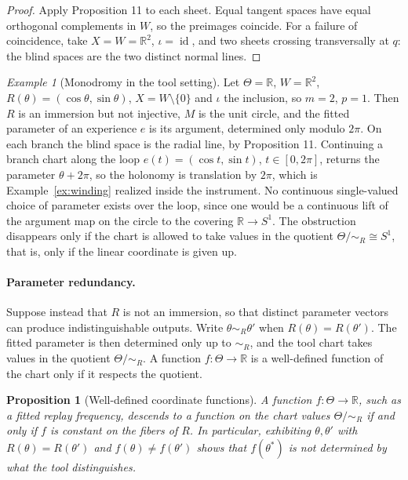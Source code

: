 \documentclass[11pt]{article}
\newtheorem{proposition}{Proposition}
\theoremstyle{remark}
\newtheorem{example}{Example}
\newcommand{\R}{\mathbb{R}}
\newcommand{\id}{\operatorname{id}}
\begin{document}
\begin{proof}
Apply Proposition 11 to each sheet. Equal tangent spaces have equal orthogonal complements in $W$, so the preimages coincide. For a failure of coincidence, take $X=W=\R^2$, $\iota=\id$, and two sheets crossing transversally at $q$: the blind spaces are the two distinct normal lines.
\end{proof}

\begin{example}[Monodromy in the tool setting]\label{ex:mono}
Let $\Theta=\R$, $W=\R^2$, $R(\theta)=(\cos\theta,\sin\theta)$, $X=W\setminus\{0\}$ and $\iota$ the inclusion, so $m=2$, $p=1$. Then $R$ is an immersion but not injective, $M$ is the unit circle, and the fitted parameter of an experience $e$ is its argument, determined only modulo $2\pi$. On each branch the blind space is the radial line, by Proposition 11. Continuing a branch chart along the loop $e(t)=(\cos t,\sin t)$, $t\in[0,2\pi]$, returns the parameter $\theta+2\pi$, so the holonomy is translation by $2\pi$, which is Example~\ref{ex:winding} realized inside the instrument. No continuous single-valued choice of parameter exists over the loop, since one would be a continuous lift of the argument map on the circle to the covering $\R\to S^1$. The obstruction disappears only if the chart is allowed to take values in the quotient $\Theta/{\sim_R}\cong S^1$, that is, only if the linear coordinate is given up.
\end{example}

\paragraph{Parameter redundancy.} Suppose instead that $R$ is not an immersion, so that distinct parameter vectors can produce indistinguishable outputs. Write $\theta\sim_R\theta'$ when $R(\theta)=R(\theta')$. The fitted parameter is then determined only up to $\sim_R$, and the tool chart takes values in the quotient $\Theta/{\sim_R}$. A function $f:\Theta\to\R$ is a well-defined function of the chart only if it respects the quotient.

\begin{proposition}[Well-defined coordinate functions]\label{prop:wellfn}
A function $f:\Theta\to\R$, such as a fitted replay frequency, descends to a function on the chart values $\Theta/{\sim_R}$ if and only if $f$ is constant on the fibers of $R$. In particular, exhibiting $\theta,\theta'$ with $R(\theta)=R(\theta')$ and $f(\theta)\ne f(\theta')$ shows that $f(\theta^\ast)$ is not determined by what the tool distinguishes.
\end{proposition}
\end{document}
